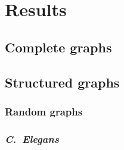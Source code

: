 \documentclass[pdflatex,lineno,referee,sn-mathphys-ay]{class/sn-jnl}
\begin{document}
\section{Results}
\subsection{Complete graphs}
\subsection{Structured graphs}
\subsubsection{Random graphs}
\subsubsection{\emph{C.\ Elegans}}
\end{document}
